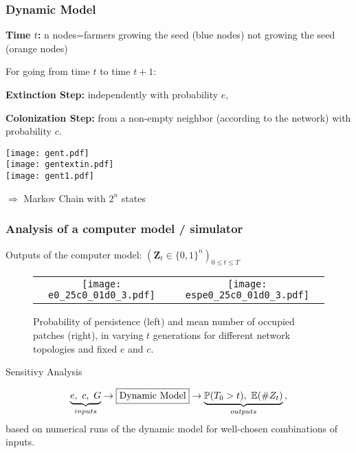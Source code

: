 \documentclass[nopagenumber,9pt]{beamer}
\newcommand{\E}{\mathbb{E}}
\renewcommand{\P}{\mathbb{P}}
\newcommand{\bZ}{\mathbf{Z}}
\begin{document}
	\begin{frame}
	 \frametitle{Dynamic Model}
	 \begin{minipage}{0.60\linewidth}
	 \vspace{-1cm}
	  \textbf{Time $t$:} n nodes=farmers growing the seed (blue nodes) not growing the seed (orange nodes)\\
	  
	  \vspace{.5cm}
	  
	  For going from time $t$ to time $t+1$:\\
	  
	  \vspace{.2cm}
	  
	  \textbf{Extinction Step:} independently with probability $e$,\\
	  
	  \vspace{1cm}
	  
	  \textbf{Colonization Step:} from a non-empty neighbor (according to the network) with probability $c$.
	 \end{minipage}\hfill
	 \begin{minipage}{.36\linewidth}
	  \centering
	\texttt{[image: gent.pdf]}\\
\texttt{[image: gentextin.pdf]}\\
\texttt{[image: gent1.pdf]}
	 \end{minipage}

	 
	 $\Rightarrow$ Markov Chain with $2^n$ states


	 
	\end{frame}


	\begin{frame}
	 \frametitle{Analysis of a computer model / simulator}
	 
	 Outputs of the computer model: $(\bZ_t\in\{0,1\}^n)_{0\le t\le T}$
	 
	 \begin{figure}[h!]
\centering
\begin{tabular}{cc}
 \texttt{[image: e0\_25c0\_01d0\_3.pdf]}&
 \texttt{[image: espe0\_25c0\_01d0\_3.pdf]}
\end{tabular}
	\caption{Probability of persistence (left) and  mean number of occupied patches (right), 
in varying $t$ generations for different network topologies and fixed $e$ and $c$.}
\label{figdifftopo}
\end{figure}
	 
	 
	 \begin{beamerboxesrounded}{Sensitivy Analysis}
 
 $$\underbrace{e, \ c ,\ G}_{inputs} \rightarrow\fbox{Dynamic Model}\rightarrow \underbrace{\P(T_0> t),\ \E(\#Z_{t})}_{outputs}   \,,$$
based on numerical runs of the dynamic model for well-chosen combinations of inputs.
 
\end{beamerboxesrounded}


	\end{frame}
\end{document}
